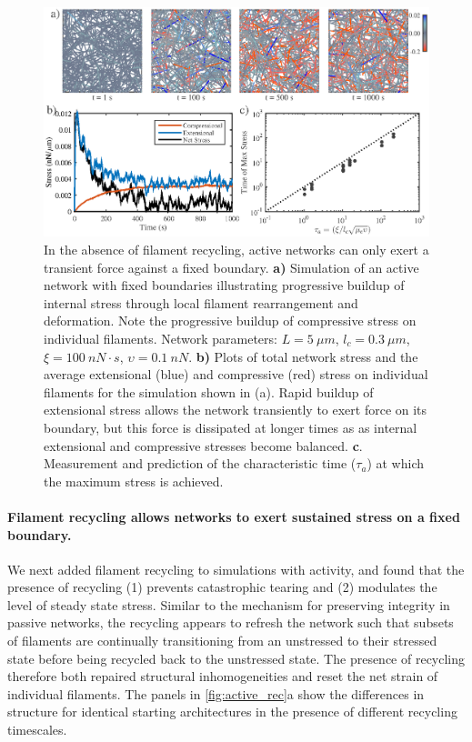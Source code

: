 \documentclass[10pt,letterpaper]{article}
\begin{document}
\begin{figure}[h!]
	\centering
	\includegraphics[width=\hsize]{figures/figure4b}
	\caption{\label{fig:active_str} In the absence of filament recycling, active networks can only exert a transient force against a fixed boundary.  \textbf{a)} Simulation of an active network with fixed boundaries illustrating progressive buildup of internal stress through local filament rearrangement and deformation. Note the progressive buildup of compressive stress on individual filaments. Network parameters: $L=5\: \mu m$, $l_c=0.3\: \mu m$, $\xi=100\: nN\cdot s$, $\upsilon=0.1\: nN$.  \textbf{b)} Plots of total network stress and the average extensional (blue) and compressive (red) stress on individual filaments for the simulation shown in (a). Rapid buildup of extensional stress allows the network transiently to exert force on its boundary, but this force is dissipated at longer times as   as internal extensional and compressive stresses become balanced. \textbf{c}. Measurement and prediction of the characteristic time ($\tau_a$) at which the maximum stress is achieved. }
\end{figure}

\paragraph{Filament recycling allows networks to exert sustained stress on a fixed boundary.}


We next added filament recycling to simulations with activity, and found that the presence of recycling (1) prevents catastrophic tearing and (2) modulates the level of steady state stress.  Similar to the mechanism for preserving integrity in passive networks, the recycling appears to refresh the network such that subsets of filaments are continually transitioning from an unstressed to their stressed state before being recycled back to the unstressed state.  The presence of recycling therefore both repaired structural inhomogeneities and reset the net strain of individual filaments. The panels in \ref{fig:active_rec}a show the differences in structure for identical starting architectures in the presence of different recycling timescales.  
\end{document}
